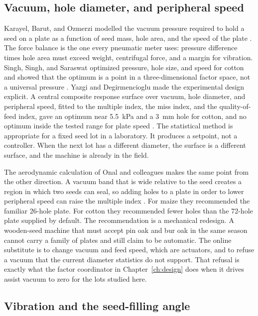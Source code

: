 \subsection{Vacuum, hole diameter, and peripheral speed}

Karayel, Barut, and Ozmerzi modelled the vacuum pressure required to hold a seed on a plate as a function of seed mass, hole area, and the speed of the plate \cite{karayel2004}. The force balance is the one every pneumatic meter uses: pressure difference times hole area must exceed weight, centrifugal force, and a margin for vibration. Singh, Singh, and Saraswat optimized pressure, hole size, and speed for cotton and showed that the optimum is a point in a three-dimensional factor space, not a universal pressure \cite{singh2005}. Yazgi and Degirmencioglu made the experimental design explicit. A central composite response surface over vacuum, hole diameter, and peripheral speed, fitted to the multiple index, the miss index, and the quality-of-feed index, gave an optimum near 5.5~kPa and a 3~mm hole for cotton, and no optimum inside the tested range for plate speed \cite{yazgi2007}. The statistical method is appropriate for a fixed seed lot in a laboratory. It produces a setpoint, not a controller. When the next lot has a different diameter, the surface is a different surface, and the machine is already in the field.

The aerodynamic calculation of Onal and colleagues makes the same point from the other direction. A vacuum band that is wide relative to the seed creates a region in which two seeds can seal, so adding holes to a plate in order to lower peripheral speed can raise the multiple index \cite{onal2012}. For maize they recommended the familiar 26-hole plate. For cotton they recommended fewer holes than the 72-hole plate supplied by default. The recommendation is a mechanical redesign. A wooden-seed machine that must accept pin oak and bur oak in the same season cannot carry a family of plates and still claim to be automatic. The online substitute is to change vacuum and feed speed, which are actuators, and to refuse a vacuum that the current diameter statistics do not support. That refusal is exactly what the factor coordinator in Chapter~\ref{ch:design} does when it drives assist vacuum to zero for the lots studied here.

\subsection{Vibration and the seed-filling angle}

